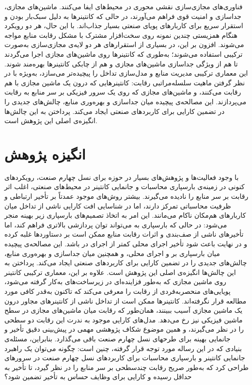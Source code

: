 فناوری‌های مجازی‌سازی نقشی محوری در محیط‌های  ایفا می‌کنند. ماشین‌های مجازی، جداسازی و امنیت قوی فراهم می‌آورند، در حالی که کانتینرها به دلیل سبک‌بار بودن و استقرار سریع برای کاربارهای پویای صنعتی بسیار جذاب‌اند. با این حال، هر دو رویکرد هنگام همزیستی چندین نمونه روی سخت‌افزار مشترک با مشکل رقابت منابع مواجه می‌شوند. افزون بر این، در بسیاری از استقرارهای  هر دو لایه‌ی مجازی‌سازی به‌صورت ترکیبی استفاده می‌شوند؛ به‌طوری که کانتینرها روی ماشین‌های مجازی اجرا می‌گردند تا هم از ویژگی جداسازی ماشین‌های مجازی و هم از چابکی کانتینرها بهره‌مند شوند. این معماری ترکیبی مدیریت منابع و مدل‌سازی تداخل را پیچیده‌تر می‌سازد، به‌ویژه با در نظر گرفتن ماهیت سلسله‌مراتبی رقابت: کانتینرهایی که درون یک ماشین مجازی با هم رقابت می‌کنند، و ماشین‌های مجازی که روی یک سرور فیزیکی  بر سر منابع به رقابت می‌پردازند.
این مصالحه‌ی پیچیده میان جدا‌سازی و بهره‌وری منابع، چالش‌های جدیدی را در تضمین کارایی برای کاربردهای صنعتی ایجاد می‌کند. پرداختن به این چالش‌ها انگیزه‌ی اصلی این پژوهش است.

\section{انگیزه پژوهش}

با وجود فعالیت‌ها و پژوهش‌های بسیار در حوزه  برای نسل چهارم صنعت، رویکردهای کنونی در زمینه‌ی بارسپاری محاسبات و جانمایی کانتینر در محیط‌های صنعتی، اغلب اثر رقابت بر سر منابع را نادیده می‌گیرند. بیشتر روش‌های موجود عمدتاً بر تأخیر ارتباطی و ظرفیت محاسباتی تمرکز دارند، اما در شناسایی افت کارایی ناشی از تداخل میان کاربارهای هم‌مکان ناکام می‌مانند. این امر به اتخاذ تصمیم‌های بارسپاری زیر بهینه منجر می‌شود: در حالی که بارسپاری به  می‌تواند توان پردازشی بالاتری فراهم کند، اما تأخیرهای ناشی از صف‌بندی و اثرات رقابت منابع ممکن است بر دستاوردها غلبه کرده و در نهایت باعث شود تأخیر اجرای محلی کمتر از اجرای در  باشد.
این مصالحه‌ی پیچیده میان بارسپاری بر  و اجرای محلی، و همچنین میان جدا‌سازی و بهره‌وری منابع، چالش‌های جدیدی را در تضمین کارایی برای کاربردهای صنعتی ایجاد می‌کند. پرداختن به این چالش‌ها انگیزه‌ی اصلی این پژوهش است.
علاوه بر این، معماری ترکیبی کانتینر روی ماشین مجازی که به‌طور فزاینده‌ای در زیرساخت‌های  به‌کار گرفته می‌شود، پویایی‌های منحصربه‌فردی از رقابت را معرفی می‌کند که تاکنون به‌قدر کافی مورد مطالعه قرار نگرفته‌اند. کانتینرها ممکن است از تداخل ناشی از کانتینرهای مجاور درون یک ماشین مجازی آسیب ببینند، همان‌طور که رقابت میان ماشین‌های مجازی در سطح ماشین فیزیکی نیز رخ می‌دهد. مدل‌های کارایی موجود به ندرت این رقابت دو سطحی را در نظر می‌گیرند، و همین موضوع شکاف پژوهشی مهمی در پیش‌بینی دقیق تأخیر و جانمایی بهینه برای طرحهای نسل چهارم صنعت باقی می‌گذارد.
بنابراین، مسئله‌ی بنیادی که در این رساله مورد توجه قرار گرفته، چنین است:
چگونه می‌توان یک راهبرد جانمایی کانتینر و بارسپاری محاسبات برای کاربردهای نسل چهارم صنعت در سرورهای  طراحی کرد که به‌طور صریح رقابت چندسطحی بر سر منابع را در نظر گیرد، تا تأخیر به حداقل رسیده و کارایی برای وظایف حساس به تأخیر تضمین شود؟

